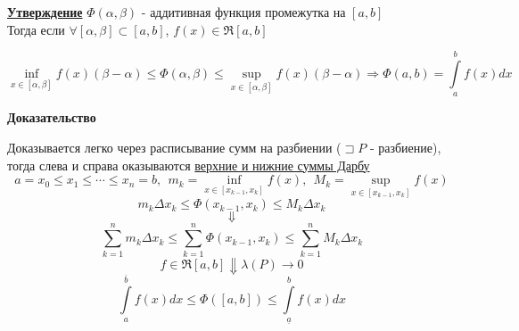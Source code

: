 \documentclass[a4paper,11pt]{article}
\newcommand{\Let}{\sqsupset}
\newcommand{\ubf}[1]{ \noindent\textbf{\underline{#1}}}
\newcommand{\Sum}{\sum\limits_{k = 1}^n}
\begin{document}
\ubf{Утверждение} $\Phi(\alpha, \beta)$ - аддитивная функция промежутка на $[a, b]$\\ Тогда если  $\forall [\alpha, \beta] \subset [a, b]$, $f(x) \in \Re[a, b]$

\[
\inf\limits_{x \in [\alpha, \beta]} f(x)(\beta - \alpha) \leq \Phi(\alpha, \beta) \leq \sup\limits_{x \in [\alpha, \beta]} f(x) (\beta - \alpha) \Rightarrow \Phi(a, b) = \int\limits_{a}^b f(x)dx
\]

\textbf{Доказательство}

Доказывается легко через расписывание сумм на разбиении ($\Let P$ - разбиение), тогда слева и справа оказываются \hyperref[def:intDarbu]{верхние и нижние суммы Дарбу}
\[
a = x_0 \leq x_1 \leq  \cdots \leq x_n = b, \ \ m_k = \inf\limits_{x \in [x_{k-1}, x_k]} f(x), \ \ M_k = \sup\limits_{x \in [x_{k-1}, x_k]} f(x)
\]
\[
m_k \Delta x_k \leq \Phi(x_{k-1}, x_k)  \leq M_k\Delta x_k
\]
\[
\Downarrow
\]
\[
\Sum m_k \Delta x_k \leq \Sum \Phi(x_{k-1}, x_k)  \leq \Sum M_k\Delta x_k
\]
\[
f \in \Re[a, b] \Downarrow \lambda(P) \to 0
\]
\[
\int\limits_{a}^{\overline{b}} f(x)dx \leq \Phi([a, b]) \leq  \int\limits_{\underline{a}}^b f(x)dx 
\]
\end{document}
